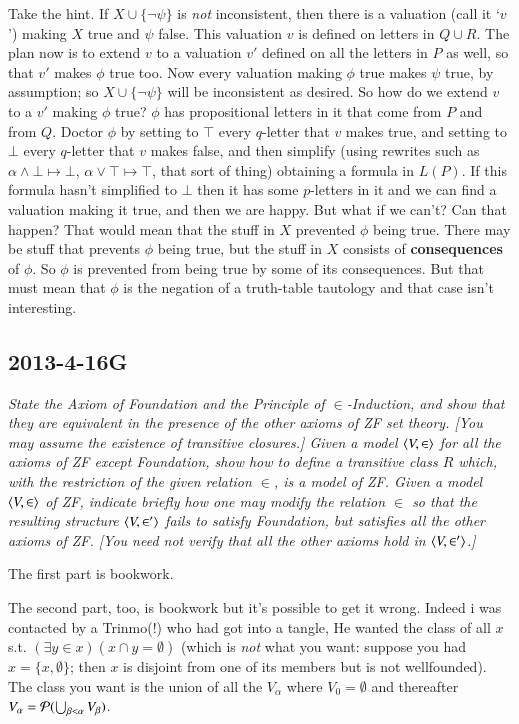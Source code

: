 \documentclass{book}
\begin{document}
Take the hint. If $X \cup \{\neg \psi\}$ is {\sl not} inconsistent,
then there is a valuation (call it `$v$') making $X$ true and $\psi$
false.  This valuation $v$ is defined on letters in $Q \cup R$. The
plan now is to extend $v$ to a valuation $v'$ defined on all the
letters in $P$ as well, so that $v'$ makes $\phi$ true too.  Now every
valuation making $\phi$ true makes $\psi$ true, by assumption; so $X
\cup \{\neg \psi\}$ will be inconsistent as desired.  So how do we
extend $v$ to a $v'$ making $\phi$ true?  $\phi$ has propositional
letters in it that come from $P$ and from $Q$. Doctor $\phi$ by
setting to $\top$ every $q$-letter that $v$ makes true, and setting to
$\bot$ every $q$-letter that $v$ makes false, and then simplify (using
rewrites such as $\alpha \wedge \bot \mapsto \bot$, $\alpha \vee \top
\mapsto \top$, that sort of thing) obtaining a formula in $L(P)$. If
this formula hasn't simplified to $\bot$ then it has some $p$-letters
in it and we can find a valuation making it true, and then we are
happy.  But what if we can't?  Can that happen?  That would mean that
the stuff in $X$ prevented $\phi$ being true. There may be stuff that
prevents $\phi$ being true, but the stuff in $X$ consists of {\bf
  consequences} of $\phi$.  So $\phi$ is prevented from being true by
some of its consequences.  But that must mean that $\phi$ is the
negation of a truth-table tautology and that case isn't interesting.

\subsection*{2013-4-16G}



{\sl State the Axiom of Foundation and the Principle of $\in$-Induction,
and show that they are equivalent in the presence of the other axioms
of ZF set theory. [You may assume the existence of transitive
closures.]  Given a model $\mbox{$\langle V, \in \rangle$}$
for all the axioms of ZF except
Foundation, show how to define a transitive class $R$ which, with the
restriction of the given relation $\in$, is a model of ZF.  Given a model
$\mbox{$\langle V, \in \rangle$}$ of ZF, indicate briefly how one may modify the relation $\in$ so
that the resulting structure $\mbox{$\langle V, \in' \rangle$}$ fails to satisfy Foundation,
but satisfies all the other axioms of ZF. [You need not verify that
all the other axioms hold in $\mbox{$\langle V, \in' \rangle$}$.]}

The first part is bookwork.

The second part, too, is bookwork but it's possible to get it wrong.
Indeed i was contacted by a Trinmo(!) who had got into a tangle, He
wanted the class of all $x$ s.t.
$(\exists y \in x)(x \cap y = \emptyset)$ (which is {\sl not} what
you want: suppose you had $x = \{x,\emptyset\}$; then $x$ is disjoint
from one of its members but is not wellfounded).  The class you want
is the union of all the $V_\alpha$ where $V_0 = \emptyset$ and thereafter
$V_\alpha = {\cal P}(\bigcup_{\beta < \alpha}V_\beta)$.
\end{document}
